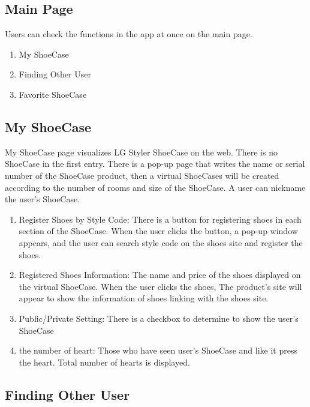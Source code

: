 \documentclass[conference]{IEEEtran}
\begin{document}
\subsection{Main Page}
Users can check the functions in the app at once on the main page. \\
\begin{enumerate}
    \item My ShoeCase\\
    \item Finding Other User\\
    \item Favorite ShoeCase\\
\end{enumerate}

\subsection{My ShoeCase}
My ShoeCase page visualizes LG Styler ShoeCase on the web. There is no ShoeCase in the first entry. There is a pop-up page that writes the name or serial number of the ShoeCase product, then a virtual ShoeCases will be created according to the number of rooms and size of the ShoeCase. A user can nickname the user's ShoeCase.

\begin{enumerate}
    \item Register Shoes by Style Code: There is a button for registering shoes in each section of the ShoeCase. When the user clicks the button, a pop-up window appears, and the user can search style code on the shoes site and register the shoes.
\\
    \item Registered Shoes Information: The name and price of the shoes displayed on the virtual ShoeCase. When the user clicks the shoes, The product’s site will appear to show the information of shoes linking with the shoes site.
\\
    \item Public/Private Setting: There is a checkbox to determine to show the user's ShoeCase
\\
    \item the number of heart: Those who have seen user's ShoeCase and like it press the heart. Total number of hearts is displayed.\\
\end{enumerate}

\subsection{Finding Other User}
\end{document}
